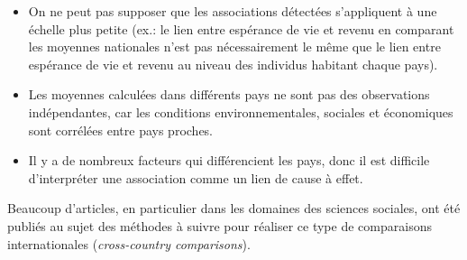 \documentclass[
]{article}
\begin{document}
\begin{itemize}
\item
  On ne peut pas supposer que les associations détectées s'appliquent à
  une échelle plus petite (ex.: le lien entre espérance de vie et revenu
  en comparant les moyennes nationales n'est pas nécessairement le même
  que le lien entre espérance de vie et revenu au niveau des individus
  habitant chaque pays).
\item
  Les moyennes calculées dans différents pays ne sont pas des
  observations indépendantes, car les conditions environnementales,
  sociales et économiques sont corrélées entre pays proches.
\item
  Il y a de nombreux facteurs qui différencient les pays, donc il est
  difficile d'interpréter une association comme un lien de cause à
  effet.
\end{itemize}

Beaucoup d'articles, en particulier dans les domaines des sciences
sociales, ont été publiés au sujet des méthodes à suivre pour réaliser
ce type de comparaisons internationales (\emph{cross-country
comparisons}).
\end{document}
